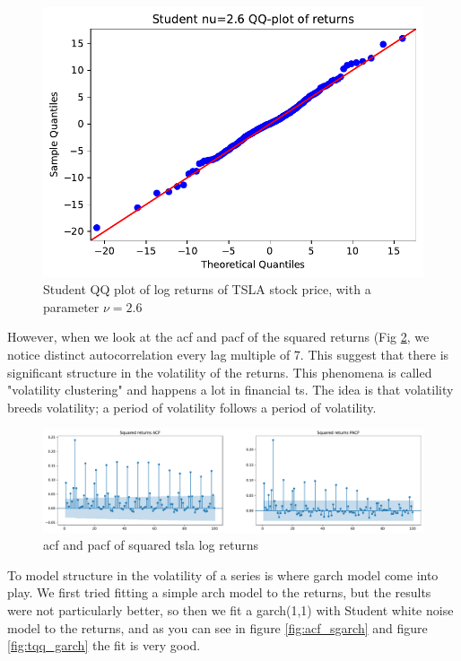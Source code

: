 \begin{figure}
	\centering
	\includegraphics[width=\textwidth]{img/img_tqq_returns.pdf}
	\caption{Student QQ plot of log returns of TSLA stock price, with a parameter $\nu=2.6$}
	\label{fig:tqq_returns}
\end{figure}

However, when we look at the \acrshort{acf} and \acrshort{pacf} of the squared returns (Fig \ref{fig:acf_sreturns}, we notice distinct autocorrelation every lag multiple of 7. This suggest that there is significant structure in the volatility of the returns. This phenomena is called "volatility clustering" and happens a lot in financial \acrlong{ts}. The idea is that volatility breeds volatility; a period of volatility follows a period of volatility. 

\begin{figure}
	\centering
	\includegraphics[width=\textwidth]{img/img_sreturns.pdf}
	\caption{\acrshort{acf} and \acrshort{pacf} of squared \acrshort{tsla} log returns}
	\label{fig:acf_sreturns}
\end{figure}

To model structure in the volatility of a series is where \acrshort{garch} model come into play. We first tried fitting a simple \acrshort{arch} model to the returns, but the results were not particularly better, so then we fit a \acrshort{garch}(1,1) with Student white noise model to the returns, and as you can see in figure \ref{fig:acf_sgarch} and figure \ref{fig:tqq_garch} the fit is very good.

